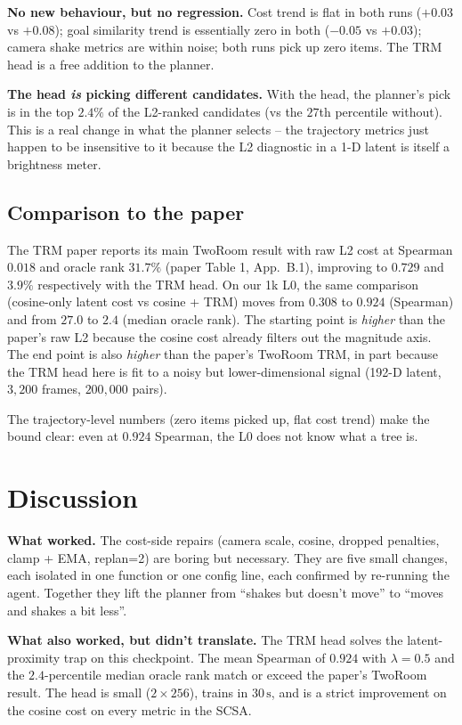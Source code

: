 \documentclass[11pt]{article}
\begin{document}
\textbf{No new behaviour, but no regression.}
Cost trend is flat in both runs ($+0.03$ vs $+0.08$); goal
similarity trend is essentially zero in both ($-0.05$ vs $+0.03$);
camera shake metrics are within noise; both runs pick up zero
items. The TRM head is a free addition to the planner.

\textbf{The head \emph{is} picking different candidates.}
With the head, the planner's pick is in the top $2.4\%$ of the
L2-ranked candidates (vs the $27$th percentile without).
This is a real change in what the planner selects -- the
trajectory metrics just happen to be insensitive to it because
the L2 diagnostic in a 1-D latent is itself a brightness meter.

\subsection{Comparison to the paper}

The TRM paper reports its main TwoRoom result with raw L2 cost at
Spearman $0.018$ and oracle rank $31.7\%$ (paper Table 1, App.~B.1),
improving to $0.729$ and $3.9\%$ respectively with the TRM head.
On our 1k L0, the same comparison (cosine-only latent cost vs
cosine + TRM) moves from $0.308$ to $0.924$ (Spearman) and from
$27.0$ to $2.4$ (median oracle rank). The starting point is
\emph{higher} than the paper's raw L2 because the cosine cost
already filters out the magnitude axis. The end point is also
\emph{higher} than the paper's TwoRoom TRM, in part because the
TRM head here is fit to a noisy but lower-dimensional signal
(192-D latent, $3{,}200$ frames, $200{,}000$ pairs).

The trajectory-level numbers (zero items picked up, flat cost
trend) make the bound clear: even at $0.924$ Spearman, the L0
does not know what a tree is.

\section{Discussion}
\label{sec:discussion}

\textbf{What worked.} The cost-side repairs (camera scale,
cosine, dropped penalties, clamp + EMA, replan=2) are boring but
necessary. They are five small changes, each isolated in one
function or one config line, each confirmed by re-running the
agent. Together they lift the planner from ``shakes but doesn't
move'' to ``moves and shakes a bit less''.

\textbf{What also worked, but didn't translate.} The TRM head
solves the latent-proximity trap on this checkpoint. The
mean Spearman of $0.924$ with $\lambda = 0.5$ and the
$2.4$-percentile median oracle rank match or exceed the paper's
TwoRoom result. The head is small ($2 \times 256$), trains in
$30\,\mathrm{s}$, and is a strict improvement on the cosine cost
on every metric in the SCSA.
\end{document}
